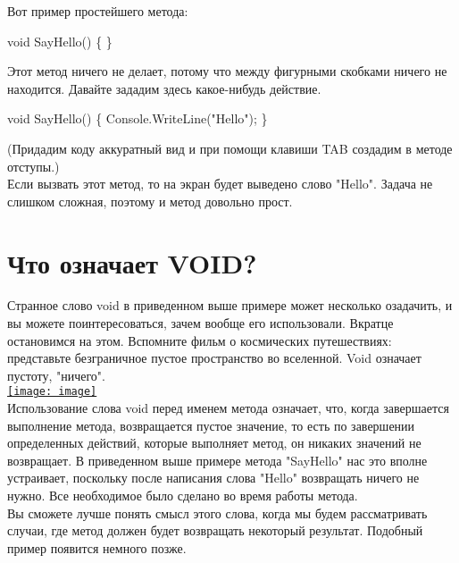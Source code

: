 \documentclass[12pt, a4paper]{article}
\begin{document}
Вот пример простейшего метода:\\

\begin{spverbatim}void SayHello()
\{
\}\end{spverbatim}

Этот метод ничего не делает, потому что между фигурными скобками ничего не находится. Давайте зададим здесь какое-нибудь действие.\\

\begin{spverbatim}void SayHello()
\{
    Console.WriteLine("Hello");
\}\end{spverbatim}

(Придадим коду аккуратный вид и при помощи клавиши TAB создадим в методе отступы.)\\

Если вызвать этот метод, то на экран будет выведено слово "Hello". Задача не слишком сложная, поэтому и метод довольно прост.\\

\section{Что означает VOID?}
Странное слово void  в приведенном выше примере может несколько озадачить, и вы можете поинтересоваться, зачем вообще его использовали. Вкратце остановимся на этом. Вспомните фильм о космических путешествиях: представьте безграничное пустое пространство во вселенной. Void означает пустоту, "ничего".\\


\bigbreak \href{http://www.intuit.ru//EDI/25_09_16_1/1474755579-437/tutorial/590/objects/3/files/02-23.jpg}                         {\texttt{[image: image]}}\\



Использование слова void  перед именем метода означает, что, когда завершается выполнение метода, возвращается пустое значение, то есть по завершении определенных действий, которые выполняет метод, он никаких значений не возвращает. В приведенном выше примере метода "SayHello" нас это вполне устраивает, поскольку после написания слова "Hello" возвращать ничего не нужно. Все необходимое было сделано во время работы метода.\\

Вы сможете лучше понять смысл этого слова, когда мы будем рассматривать случаи, где метод должен будет возвращать некоторый результат. Подобный пример появится немного позже.\\
\end{document}
